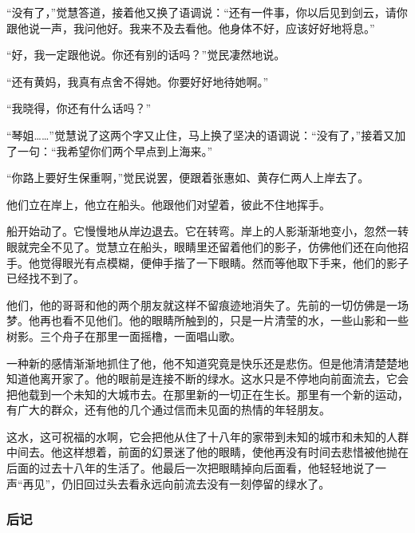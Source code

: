 \par “没有了，”觉慧答道，接着他又换了语调说：“还有一件事，你以后见到剑云，请你跟他说一声，我问他好。我来不及去看他。他身体不好，应该好好地将息。”
\par “好，我一定跟他说。你还有别的话吗？”觉民凄然地说。
\par “还有黄妈，我真有点舍不得她。你要好好地待她啊。”
\par “我晓得，你还有什么话吗？”
\par “琴姐……”觉慧说了这两个字又止住，马上换了坚决的语调说：“没有了，”接着又加了一句：“我希望你们两个早点到上海来。”
\par “你路上要好生保重啊，”觉民说罢，便跟着张惠如、黄存仁两人上岸去了。
\par 他们立在岸上，他立在船头。他跟他们对望着，彼此不住地挥手。
\par 船开始动了。它慢慢地从岸边退去。它在转弯。岸上的人影渐渐地变小，忽然一转眼就完全不见了。觉慧立在船头，眼睛里还留着他们的影子，仿佛他们还在向他招手。他觉得眼光有点模糊，便伸手揩了一下眼睛。然而等他取下手来，他们的影子已经找不到了。
\par 他们，他的哥哥和他的两个朋友就这样不留痕迹地消失了。先前的一切仿佛是一场梦。他再也看不见他们。他的眼睛所触到的，只是一片清莹的水，一些山影和一些树影。三个舟子在那里一面摇橹，一面唱山歌。
\par 一种新的感情渐渐地抓住了他，他不知道究竟是快乐还是悲伤。但是他清清楚楚地知道他离开家了。他的眼前是连接不断的绿水。这水只是不停地向前面流去，它会把他载到一个未知的大城市去。在那里新的一切正在生长。那里有一个新的运动，有广大的群众，还有他的几个通过信而未见面的热情的年轻朋友。
\par 这水，这可祝福的水啊，它会把他从住了十八年的家带到未知的城市和未知的人群中间去。他这样想着，前面的幻景迷了他的眼睛，使他再没有时间去悲惜被他抛在后面的过去十八年的生活了。他最后一次把眼睛掉向后面看，他轻轻地说了一声“再见”，仍旧回过头去看永远向前流去没有一刻停留的绿水了。




\subsubsection*{后记}

